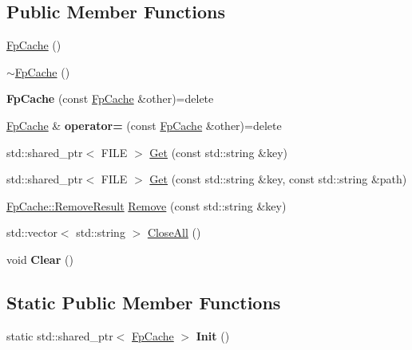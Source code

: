 \subsection*{Public Member Functions}
\begin{DoxyCompactItemize}
\item 
\hyperlink{classlog2hdfs_1_1FpCache_ad897ec187b661d08cacf4daf7847754e}{Fp\+Cache} ()
\item 
\hyperlink{classlog2hdfs_1_1FpCache_a6eb730b44c83f3984a95328a8d31c26e}{$\sim$\+Fp\+Cache} ()
\item 
{\bfseries Fp\+Cache} (const \hyperlink{classlog2hdfs_1_1FpCache}{Fp\+Cache} \&other)=delete\hypertarget{classlog2hdfs_1_1FpCache_ac4ef9c65d099f68cd98416200f703e72}{}\label{classlog2hdfs_1_1FpCache_ac4ef9c65d099f68cd98416200f703e72}

\item 
\hyperlink{classlog2hdfs_1_1FpCache}{Fp\+Cache} \& {\bfseries operator=} (const \hyperlink{classlog2hdfs_1_1FpCache}{Fp\+Cache} \&other)=delete\hypertarget{classlog2hdfs_1_1FpCache_ae476c77e6844928c73205a8816b6ecc4}{}\label{classlog2hdfs_1_1FpCache_ae476c77e6844928c73205a8816b6ecc4}

\item 
std\+::shared\+\_\+ptr$<$ F\+I\+LE $>$ \hyperlink{classlog2hdfs_1_1FpCache_a37b5d20805bd50fcc06b5a3e3c626817}{Get} (const std\+::string \&key)
\item 
std\+::shared\+\_\+ptr$<$ F\+I\+LE $>$ \hyperlink{classlog2hdfs_1_1FpCache_a4685f018669a416f2b495012f42e3eba}{Get} (const std\+::string \&key, const std\+::string \&path)
\item 
\hyperlink{classlog2hdfs_1_1FpCache_a5a925c5b356be91cf262e5219dafdabe}{Fp\+Cache\+::\+Remove\+Result} \hyperlink{classlog2hdfs_1_1FpCache_a5e9a1f0e88c2d8b0b5acfbaee3f8140b}{Remove} (const std\+::string \&key)
\item 
std\+::vector$<$ std\+::string $>$ \hyperlink{classlog2hdfs_1_1FpCache_a420b328e3bb226866f3344d75e13e6e7}{Close\+All} ()
\item 
void {\bfseries Clear} ()\hypertarget{classlog2hdfs_1_1FpCache_ada663f72b8f95401da64156c4f65fdd3}{}\label{classlog2hdfs_1_1FpCache_ada663f72b8f95401da64156c4f65fdd3}

\end{DoxyCompactItemize}
\subsection*{Static Public Member Functions}
\begin{DoxyCompactItemize}
\item 
static std\+::shared\+\_\+ptr$<$ \hyperlink{classlog2hdfs_1_1FpCache}{Fp\+Cache} $>$ {\bfseries Init} ()\hypertarget{classlog2hdfs_1_1FpCache_a01ea7bc476e2cee865d6e425f576e29f}{}\label{classlog2hdfs_1_1FpCache_a01ea7bc476e2cee865d6e425f576e29f}

\end{DoxyCompactItemize}


